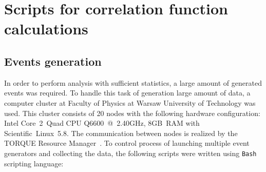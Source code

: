 %
\chapter{Scripts for correlation function calculations}
\label{a:a}
  \section{Events generation}
    In order to perform analysis with sufficient statistics, a large amount of generated events was required.
    To handle this task of generation large amount of data, a computer cluster at Faculty of Physics at Warsaw University of Technology was used.
    This cluster consists of 20 nodes with the following hardware configuration: \mbox{Intel\textregistered} \mbox{Core\texttrademark~2 Quad} CPU \mbox{Q6600 @ 2.40GHz,} \mbox{8GB RAM} with Scientific~Linux~5.8.
    The communication between nodes is realized by the TORQUE Resource Manager~\cite{torque}.
    To control process of launching multiple event generators and collecting the data, the following scripts were written using \verb|Bash| scripting language:
